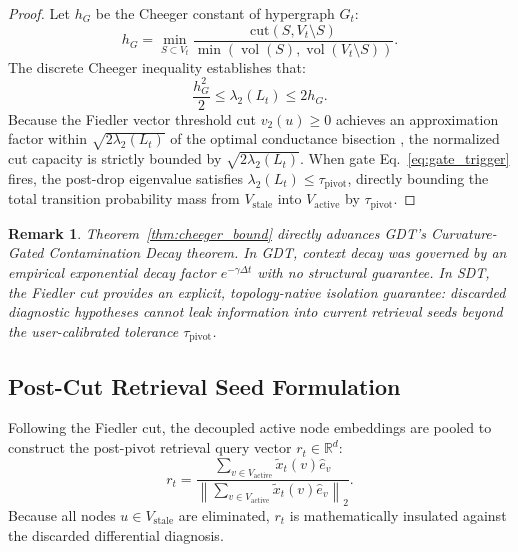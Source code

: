 \documentclass[10pt, onecolumn]{article}
\newtheorem{remark}[theorem]{Remark}
\DeclareMathOperator{\vol}{vol}
\newcommand{\R}{\mathbb{R}}
\newcommand{\norm}[1]{\left\lVert#1\right\rVert}
\begin{document}
\begin{proof}
Let $h_G$ be the Cheeger constant of hypergraph $G_t$:
\begin{equation}
  h_G = \min_{S \subset V_t} \frac{\mathrm{cut}(S, V_t \setminus S)}{\min(\vol(S), \vol(V_t \setminus S))}.
\end{equation}
The discrete Cheeger inequality establishes that:
\begin{equation}
  \frac{h_G^2}{2} \le \lambda_2(L_t) \le 2 h_G.
\end{equation}
Because the Fiedler vector threshold cut $v_2(u) \ge 0$ achieves an approximation factor within $\sqrt{2 \lambda_2(L_t)}$ of the optimal conductance bisection \cite{spielman2007spectral}, the normalized cut capacity is strictly bounded by $\sqrt{2 \lambda_2(L_t)}$. When gate Eq.~\eqref{eq:gate_trigger} fires, the post-drop eigenvalue satisfies $\lambda_2(L_t) \le \tau_{\text{pivot}}$, directly bounding the total transition probability mass from $V_{\text{stale}}$ into $V_{\text{active}}$ by $\tau_{\text{pivot}}$.
\end{proof}

\begin{remark}
Theorem~\ref{thm:cheeger_bound} directly advances GDT's Curvature-Gated Contamination Decay theorem. In GDT, context decay was governed by an empirical exponential decay factor $e^{-\gamma \Delta t}$ with no structural guarantee. In SDT, the Fiedler cut provides an explicit, topology-native isolation guarantee: discarded diagnostic hypotheses cannot leak information into current retrieval seeds beyond the user-calibrated tolerance $\tau_{\text{pivot}}$.
\end{remark}

\subsection{Post-Cut Retrieval Seed Formulation}

Following the Fiedler cut, the decoupled active node embeddings are pooled to construct the post-pivot retrieval query vector $r_t \in \R^d$:
\begin{equation}
  r_t = \frac{\sum_{v \in V_{\text{active}}} \tilde{x}_t(v) \hat{e}_v}{\norm{\sum_{v \in V_{\text{active}}} \tilde{x}_t(v) \hat{e}_v}_2}.
  \label{eq:retrieval_seed}
\end{equation}
Because all nodes $u \in V_{\text{stale}}$ are eliminated, $r_t$ is mathematically insulated against the discarded differential diagnosis.
\end{document}
